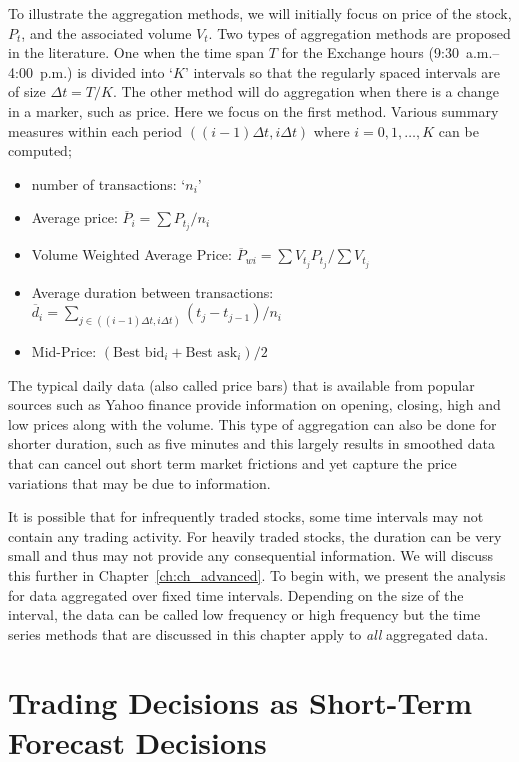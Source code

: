 To illustrate the aggregation methods, we will initially focus on price of the stock, $P_t$, and the associated volume $V_{t}$. Two types of aggregation methods are proposed in the literature. One when the time span $T$ for the Exchange hours (9:30~a.m.--4:00~p.m.) is divided into `$K$' intervals so that the regularly spaced intervals are of size $\Delta t = T/K$. The other method will do aggregation when there is a change in a marker, such as price. Here we focus on the first method. Various summary measures within each period $((i - 1)\Delta t, i\Delta t)$ where $i = 0,1,\ldots,K$ can be computed;
        \begin{itemize}
        \item number of transactions: `$n_i$'
        \item Average price: $\overline{P}_i = \sum P_{t_j}/n_i$
        \item Volume Weighted Average Price: $\overline{P}_{wi} = \sum V_{t_j} P_{t_j}/ \sum V_{t_j}$
        \item Average duration between transactions: $\overline{d}_i = \sum_{j\in ((i-1)\Delta t,i\Delta t) }(t_j - t_{j-1})/n_i$
        \item Mid-Price: $(\text{Best bid}_i+\text{Best ask}_i)/ 2$
        \end{itemize}


The typical daily data (also called price bars) that is available from popular sources such as Yahoo finance provide information on opening, closing, high and low prices along with the volume. This type of aggregation can also be done for shorter duration, such as five minutes and this largely results in smoothed data that can cancel out short term market frictions and yet capture the price variations that may be due to information. 


It is possible that for infrequently traded stocks, some time intervals may not contain any trading activity. For heavily traded stocks, the duration can be very small and thus may not provide any consequential information. We will discuss this further in Chapter~\ref{ch:ch_advanced}. To begin with, we present the analysis for data aggregated over fixed time intervals. Depending on the size of the interval, the data can be called low frequency or high frequency but the time series methods that are discussed in this chapter apply to \emph{all} aggregated data.



\section{Trading Decisions as Short-Term Forecast Decisions \label{sec:trad_dec_stfd}} 



